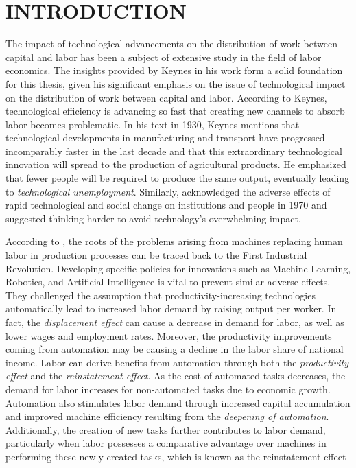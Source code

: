 \section{INTRODUCTION}


\begin{onehalfspace}
The impact of technological advancements on the distribution of work
between capital and labor has been a subject of extensive study in
the field of labor economics. The insights provided by Keynes \citeyearpar{Keynes2010}
in his work form a solid foundation for this thesis, given his significant
emphasis on the issue of technological impact on the distribution
of work between capital and labor. According to Keynes, technological
efficiency is advancing so fast that creating new channels to absorb
labor becomes problematic. In his text in 1930, Keynes mentions that
technological developments in manufacturing and transport have progressed
incomparably faster in the last decade and that this extraordinary
technological innovation will spread to the production of agricultural
products. He emphasized that fewer people will be required to produce
the same output, eventually leading to \emph{technological unemployment}.
Similarly, \citet{1970Toffler} acknowledged the adverse effects of
rapid technological and social change on institutions and people in
1970 and suggested thinking harder to avoid technology's overwhelming
impact.

According to \citet{2018Acemoglu_INBOOK}, the roots of the problems
arising from machines replacing human labor in production processes
can be traced back to the First Industrial Revolution. Developing
specific policies for innovations such as Machine Learning, Robotics,
and Artificial Intelligence is vital to prevent similar adverse effects.
They challenged the assumption that productivity-increasing technologies
automatically lead to increased labor demand by raising output per
worker. In fact, the \emph{displacement effect} can cause a decrease
in demand for labor, as well as lower wages and employment rates.
Moreover, the productivity improvements coming from automation may
be causing a decline in the labor share of national income. Labor
can derive benefits from automation through both the \emph{productivity
effect} and the \emph{reinstatement effect}. As the cost of automated
tasks decreases, the demand for labor increases for non-automated
tasks due to economic growth. Automation also stimulates labor demand
through increased capital accumulation and improved machine efficiency
resulting from the \emph{deepening of automation}. Additionally, the
creation of new tasks further contributes to labor demand, particularly
when labor possesses a comparative advantage over machines in performing
these newly created tasks, which is known as the reinstatement effect


\end{onehalfspace}
